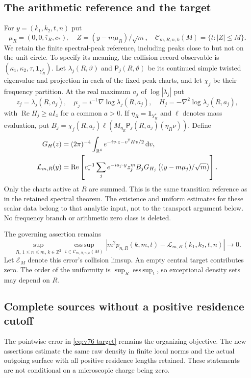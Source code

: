 \documentclass[11pt,reqno]{amsart}
\numberwithin{equation}{section}
\theoremstyle{definition}\newtheorem{definition}[theorem]{Definition}
\theoremstyle{remark}\newtheorem{remark}[theorem]{Remark}
\newcommand{\R}{\mathbb R}\newcommand{\Z}{\mathbb Z}\newcommand{\T}{\mathbb T}
\newcommand{\dd}{\,\mathrm d}\newcommand{\one}{\mathbf1}
\theoremstyle{definition}\newtheorem{inputstatement}[theorem]{Input statement}
\newcommand{\esssup}{\operatorname*{ess\,sup}}
\begin{document}
\subsection{The arithmetic reference and the target}
For $y=(k_1,k_2,t,n)$ put
\[
 \mu_R=(0,0,\bar\tau_R,c_*),\quad
 Z=(y-m\mu_R)/\sqrt m,\quad
 \mathcal C_{m,R,n,k}(M)=\{t:|Z|\le M\}.
\]
We retain the finite spectral-peak reference, including peaks close to
but not on the unit circle. To specify its meaning, the collision
record observable is $(\kappa_1,\kappa_2,\tau,\one_{Y_R^*})$.
Let $\lambda_j(R,\vartheta)$ and $\mathsf P_j(R,\vartheta)$ be its
continued simple twisted eigenvalue and projection in each of the
fixed peak charts, and let $\chi_j$ be their frequency partition.
At the real maximum $a_j$ of $\log|\lambda_j|$ put
\[
 z_j=\lambda_j(R,a_j),\quad
 \mu_j=i^{-1}\nabla\log\lambda_j(R,a_j),\quad
 H_j=-\nabla^2\log\lambda_j(R,a_j),
\]
with $\operatorname{Re}H_j\ge aI_4$ for a common $a>0$. If
$\eta_R=\one_{Y_R^*}$ and $\ell$ denotes mass evaluation, put
$B_j=\chi_j(R,a_j)\ell(M_{\eta_R}\mathsf P_j(R,a_j)(\eta_R\nu))$.
Define
\begin{align}
 G_H(z)&=(2\pi)^{-4}\int_{\R^4}e^{-iv\cdot z-v^{\mathsf T}Hv/2}\dd v,
 \notag\\
 \mathcal L_{m,R}(y)&=\operatorname{Re}\left[
 c_*^{-1}\sum_j e^{-ia_j\cdot y}z_j^m B_j
      G_{H_j}\left((y-m\mu_j)/\sqrt m\right)\right].
 \label{eq:v76-reference}
\end{align}
Only the charts active at $R$ are summed. This is the same transition
reference as in the retained spectral theorem. The existence and
uniform estimates for these scalar data belong to that analytic
input, not to the transport argument below. No frequency branch or
arithmetic zero class is deleted.

The governing assertion remains
\begin{equation}\label{eq:v76-target}
 \sup_{R,\,1\le n\le m,\,k\in\Z^2}
 \esssup_{t\in\mathcal C_{m,R,n,k}(M)}
 |m^2p_{n,R}(k,m,t)-\mathcal L_{m,R}(k_1,k_2,t,n)|\longrightarrow0.
\end{equation}
Let $\mathcal E_M$ denote this error's collision limsup. An empty
central target contributes zero. The order of the uniformity is
$\sup_R\esssup_t$, so exceptional density sets may depend on $R$.


\subsection{Complete sources without a positive residence cutoff}
The pointwise error in \eqref{eq:v76-target} remains the organizing
objective. The new assertions estimate the same raw density in finite
local norms and the actual outgoing surface with all positive residence
lengths retained. These statements are not conditional on a microscopic
charge being zero.
\end{document}
